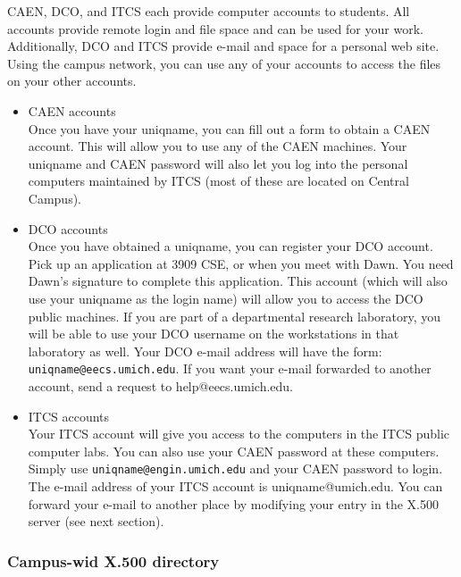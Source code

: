 \documentclass[11pt]{article}
\begin{document}
CAEN, DCO, and ITCS each provide computer accounts to students.  All
accounts provide remote login and file space and can be used for your
work.  Additionally, DCO and ITCS provide e-mail and space for a
personal web site.  Using the campus network, you can use any of your
accounts to access the files on your other accounts.
\begin{itemize}

\item CAEN accounts\\
\label{sec-7_1_5_1}%
Once you have your uniqname, you can fill out a form to obtain a CAEN
account.  This will allow you to use any of the CAEN machines.  Your
uniqname and CAEN password will also let you log into the personal
computers maintained by ITCS (most of these are located on Central
Campus).


\item DCO accounts\\
\label{sec-7_1_5_2}%
Once you have obtained a uniqname, you can register your DCO account.  Pick up an application at 3909 CSE, or when you meet with Dawn.  You need Dawn’s signature to complete this application.  This account (which will also use your uniqname as the login name) will allow you to access the DCO public machines.  If you are part of a departmental research laboratory, you will be able to use your DCO username on the workstations in that laboratory as well.
Your DCO e-mail address will have the form:  \texttt{uniqname@eecs.umich.edu}.
If you want your e-mail forwarded to another account, send a request
to help@eecs.umich.edu.


\item ITCS accounts\\
\label{sec-7_1_5_3}%
Your ITCS account will give you access to the computers in the ITCS
public computer labs. You can also use your CAEN password at these
computers.  Simply use \texttt{uniqname@engin.umich.edu} and your CAEN
password to login.  The e-mail address of your ITCS account is
uniqname@umich.edu.  You can forward your e-mail to another place by
modifying your entry in the X.500 server (see next section).
\end{itemize} %
\subsubsection{Campus-wid X.500 directory}
\label{sec-7_1_6}
\end{document}
